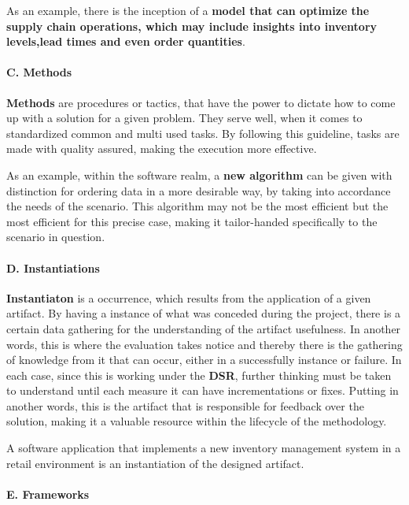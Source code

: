 As an example, there is the inception of a \textbf{model that can optimize the supply chain operations, which may include insights into inventory levels,lead times and even order quantities}.

\paragraph{C. Methods}\mbox{}

\textbf{Methods} are procedures or tactics, that have the power to dictate how to come up with a solution for a given problem. They serve well, when it comes to standardized common and multi used tasks. By following this guideline, tasks are made with quality assured, making the execution more effective.

As an example, within the software realm, a \textbf{new algorithm} can be given with distinction for ordering data in a more desirable way, by taking into accordance the needs of the scenario. This algorithm may not be the most efficient but the most efficient for this precise case, making it tailor-handed specifically to the scenario in question.

\paragraph{D. Instantiations}\mbox{}

\textbf{Instantiaton} is a occurrence, which results from the application of a given artifact. By having a instance of what was conceded during the project, there is a certain data gathering for the understanding of the artifact usefulness. In another words, this is where the evaluation takes notice and thereby there is the gathering of knowledge from it that can occur, either in a successfully instance or failure. In each case, since this is working under the \textbf{DSR}, further thinking must be taken to understand until each measure it can have incrementations or fixes. Putting in another words, this is the artifact that is responsible for feedback over the solution, making it a valuable resource within the lifecycle of the methodology.

A software application that implements a new inventory management system in a retail environment is an instantiation of the designed artifact.


\paragraph{E. Frameworks}\mbox{}

